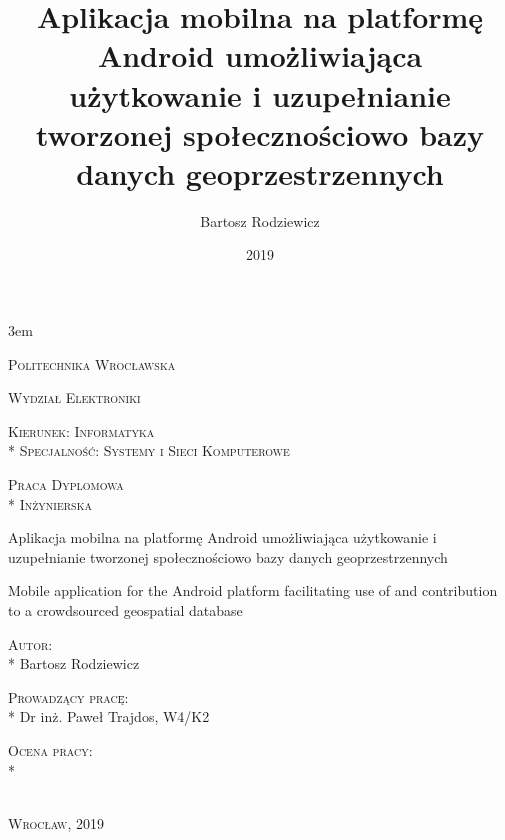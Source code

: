 \documentclass[polish,polish,a4paper,12pt]{article}
\title{Aplikacja mobilna na platformę Android umożliwiająca użytkowanie i uzupełnianie tworzonej społecznościowo bazy danych geoprzestrzennych}
\author{Bartosz Rodziewicz}
\date{2019}
\begin{document}
\emergencystretch 3em

\pagestyle{empty}

\begin{center}{\huge
	\noindent\textsc{Politechnika Wrocławska}\par
	\noindent\textsc{Wydział Elektroniki}\\
	\noindent\hrulefill
}\end{center}

{\large
	\noindent
	\textsc{Kierunek: Informatyka}\\*
	\textsc{Specjalność: Systemy i Sieci Komputerowe}
}

\begin{center}{\Huge
	\noindent
	\textsc{Praca Dyplomowa}\\*\medskip
	\textsc{Inżynierska}
}\end{center}

\vspace{2.5cm}

\begin{multicols}{2}
\hfill\columnbreak

\begin{center}{\large
	\noindent
	Aplikacja mobilna na platformę Android umożliwiająca użytkowanie i uzupełnianie tworzonej społecznościowo bazy danych geoprzestrzennych

	\bigskip
	\noindent
	Mobile application for the Android platform facilitating use of and contribution to a crowdsourced geospatial database

	\bigskip
	\bigskip
	\bigskip
	\noindent
	\textsc{Autor:}\\*\bigskip
	Bartosz Rodziewicz
}\end{center}

\vspace{2cm}

{\large
	\noindent
	\textsc{Prowadzący pracę:}\\*
	Dr inż. Paweł Trajdos, W4/K2

	\bigskip
	\noindent
	\textsc{Ocena pracy:}\\*

}

\end{multicols}

\vfill

\begin{center}{\large
	\noindent\hrulefill\\
	\textsc{Wrocław, 2019}
}\end{center}
\end{document}
